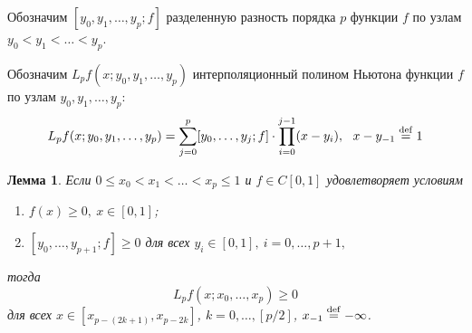 \documentclass[bachelor, och, coursework]{SCWorks}
\newcommand{\eqdef}{\stackrel {\rm def}{=}}
\newtheorem{lem}{Лемма}
\begin{document}
Обозначим $[y_0,y_1,\ldots,y_p;f]$ разделенную разность порядка $p$ функции $f$ по узлам $y_0<y_1<\ldots<y_p$.

Обозначим $L_pf(x;y_0,y_1,\ldots,y_p)$ интерполяционный полином Ньютона функции $f$ по узлам $y_0,y_1,\ldots,y_p$:
\begin{equation} \label{eq:ex01}
    L_pf(x;y_0,y_1,\ldots,y_p)=\sum_{j=0}^p[y_0, \ldots,y_{j};f]
    \cdot \prod_{i=0}^{j-1}(x-y_i), \ \ x-y_{-1}\eqdef 1
\end{equation}

\begin{lem} \label{lem:1}
    Если $0\leqslant x_0<x_1<\ldots <x_p\leqslant 1$ и
    $f\in C[0,1]$ удовлетворяет условиям
    \begin{enumerate}
        \item
            \label{it:1lem1}$f(x)\geqslant 0, \ x\in [0,1]$;
        \item
            \label{it:2lem1}
            $[y_0,\ldots,y_{p+1};f]\geqslant 0$
            для всех $y_i \in [0,1], \
            i=0,\ldots,p+1,$
    \end{enumerate}
    тогда
    \begin{equation}\label{eq:ex02}
        L_pf(x;x_0,\ldots,x_p)\geqslant 0
    \end{equation}
    для всех $x\in [x_{p-(2k+1)},x_{p-2k}]$,
    $k=0,\ldots,\left[p/2\right]$,
    $x_{-1} \eqdef -\infty$.
\end{lem}
\end{document}
